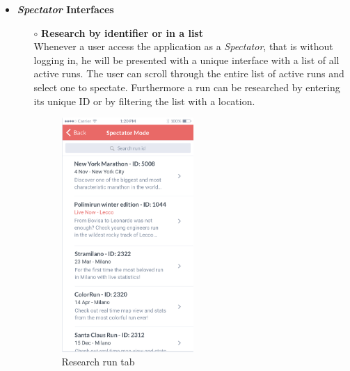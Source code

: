 \documentclass[titlepage]{article}
\begin{document}
\begin{itemize}
\begin{itemize}
\begin{itemize}
				\end{itemize}
				\item{\bf {\it Spectator} Interfaces} 
				\begin{itemize}
					\item[$\circ$] {\bf Research by identifier or in a list} \\
					Whenever a user access the application as a {\it Spectator}, that is without logging in, he will be presented with a unique interface with a list of all active runs. The user can scroll through the entire list of active runs and select one to spectate. Furthermore a run can be researched by entering its unique ID or by filtering the list with a location.\\
					\begin{figure}[H]
						\center
  						\includegraphics[width=5cm]{Mockup/mockupResearch.png}
  						\caption{Research run tab}
 					 	\label{fig:Research}
					\end{figure}


\end{itemize}
\end{itemize}
\end{itemize}
\end{document}
